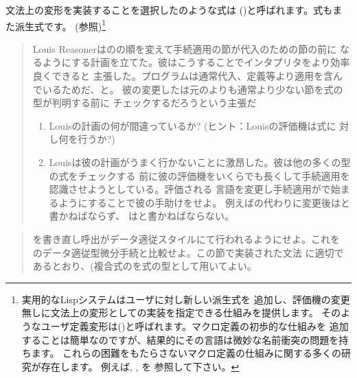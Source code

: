 \noindent
文法上の変形を実装することを選択したのような式は
()と呼ばれます。式もまた派生式です。
(参照)\footnote{実用的なLispシステムはユーザに対し新しい派生式を
追加し、評価機の変更無しに文法上の変形としての実装を指定できる仕組みを提供します。
そのようなユーザ定義変形は()と呼ばれます。マクロ定義の初歩的な仕組みを
追加することは簡単なのですが、結果的にその言語は微妙な名前衝突の問題を持ちます。
これらの困難をもたらさないマクロ定義の仕組みに関する多くの研究が存在します。
例えば, , を
参照して下さい。}

\begin{quote}
Louis Reasonerはのの順を変えて手続適用の節が代入のための節の前に
なるようにする計画を立てた。彼はこうすることでインタプリタをより効率良くできると
主張した。プログラムは通常代入、定義等より適用を含んでいるためだ、と。
彼の変更したは元のよりも通常より少ない節を式の型が判明する前に
チェックするだろうという主張だ

\begin{enumerate}[a]

\item
Louisの計画の何が間違っているか? (ヒント：Louisの評価機は式に
対し何を行うか?)

\item
Louisは彼の計画がうまく行かないことに激昂した。彼は他の多くの型の式をチェックする
前に彼の評価機をいくらでも長くして手続適用を認識させようとしている。評価される
言語を変更し手続適用がで始まるようにすることで彼の手助けをせよ。
例えばの代わりに変更後はと書かねばならず、
はと書かねばならない。

\end{enumerate}
\end{quote}

\begin{quote}
を書き直し呼出がデータ適従スタイルにて行われるようにせよ。これを
のデータ適従型微分手続と比較せよ。この節で実装された文法
に適切であるとおり、(複合式のを式の型として用いてよい。
\end{quote}

